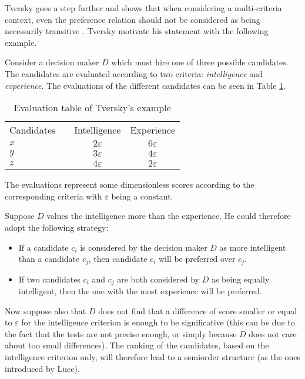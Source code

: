 Tversky goes a step further and shows that when considering a multi-criteria context, even the preference relation should not be considered as being necessarily transitive \cite{tversky1969}.
Tversky motivate his statement with the following example.

Consider a decision maker $D$ which must hire one of three possible candidates. The candidates are evaluated according to two criteria: \textit{intelligence} and \textit{experience}. The evaluations of the different candidates can be seen in Table \ref{tbl:tversky_non_transitive_preferences}.


\begin{table}[h]
\center
\begin{tabular}{ l c c c }
    \toprule
     Candidates & & Intelligence   & Experience  \\
     \cmidrule(rl){1-1}   \cmidrule{3-4}
      $x$  & & $2\varepsilon$       & $6\varepsilon$              \\
      $y$  & & $3\varepsilon$       & $4\varepsilon$            \\
      $z$  & & $4\varepsilon$       & $2\varepsilon$            \\
    \bottomrule
\end{tabular}
\caption{Evaluation table of Tversky's example \cite{tversky1969}}
\label{tbl:tversky_non_transitive_preferences}
\end{table}

The evaluations represent some dimensionless scores according to the corresponding criteria with $\varepsilon$ being a constant.

Suppose $D$ values the intelligence more than the experience.
He could therefore adopt the following strategy: 
\begin{itemize}
    \item If a candidate $c_i$ is considered by the decision maker $D$ as more intelligent than a candidate $c_j$, then candidate $c_i$ will be preferred over $c_j$.
    \item If two candidates $c_i$ and $c_j$ are both considered by $D$ as being equally intelligent, then the one with the most experience will be preferred.
\end{itemize}

Now suppose also that $D$ does not find that a difference of score smaller or equal to $\varepsilon$ for the intelligence criterion is enough to be significative (this can be due to the fact that the tests are not precise enough, or simply because $D$ does not care about too small differences).
The ranking of the candidates, based on the intelligence criterion only, will therefore lead to a semiorder structure (as the ones introduced by Luce).\\

